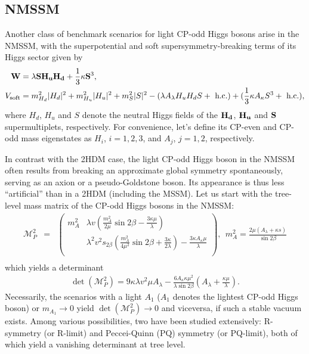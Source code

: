 \documentclass[preprintnumbers,superscriptaddress,nofootinbib,aps,prd,floatfix]{revtex4}
\begin{document}
\subsection{NMSSM}

Another class of benchmark scenarios for light CP-odd Higgs bosons arise in the NMSSM, with the superpotential and soft
supersymmetry-breaking terms of its Higgs sector given by
\begin{align}
\mathbf{W} &= \lambda \mathbf{S} \mathbf{H_u} \mathbf{H_d} + \frac{1}{3}\kappa {\bf S}^3, 
\nonumber \\
V_{\text{soft}} &= {m^2_{H_d}} |H_d|^2 + {m^2_{H_u}} |H_u|^2 + {m^2_S}|S|^2 - (\lambda A_{\lambda} H_u H_d S + \text{ h.c.} ) +  (\frac{1}{3} \kappa A_{\kappa} S^3 + \text{ h.c.} ),
\label{eqn:PQlimit}
\end{align}
where $H_d$, $H_u$ and $S$ denote the neutral Higgs fields of the ${\bf H_d}$, ${\bf H_u}$ and ${\bf S}$ supermultiplets, respectively. For convenience, let's define its CP-even and CP-odd mass eigenstates as $H_i$, $i=1,2,3$, and $A_j$, $j=1,2$, respectively.

In contrast with the 2HDM case, the light CP-odd Higgs boson in the NMSSM often results from breaking an approximate global symmetry spontaneously, serving as an axion or a pseudo-Goldstone boson. Its appearance is thus less ``artificial'' than in a 2HDM (including the MSSM). Let us start with the tree-level mass matrix of the CP-odd Higgs bosons in the NMSSM: 
\begin{eqnarray}
\mathcal{M}^2_{P} & = & \left(
\begin{array}{cc}
m_A^2
&\lambda  v \left(\frac{m_A^2 }{2\mu }\sin 2 \beta -\frac{3 \kappa  \mu }{\lambda }\right)
\\
&
\lambda ^2 v^2 s_{2\beta}  \left(\frac{m_A^2}{4\mu ^2} \sin 2 \beta+\frac{3 \kappa }{2\lambda }\right)-\frac{3
   \kappa  A_{\kappa } \mu }{\lambda }\\
\end{array} 
\right), \ \  m_A^2 = \frac{2 \mu (A_\lambda + \kappa s) }{\sin 2 \beta} \nonumber\\
\end{eqnarray}
which yields a determinant
\begin{eqnarray}
\det(\mathcal{M}^2_{P}) = 9 \kappa \lambda v^2 \mu A_\lambda - \frac{6 A_\kappa \kappa \mu^2}{\lambda \sin2\beta} \left( A_\lambda + \frac{\kappa \mu }{\lambda} \right).
\end{eqnarray}
Necessarily, the scenarios with a light $A_1$ ($A_1$ denotes the lightest CP-odd Higgs boson) or $m_{A_1} \to 0$ yield $\det(\mathcal{M}^2_{P})  \to 0$
and viceversa, if such a stable vacuum exists. Among various possibilities, two have been studied extensively: 
R-symmetry (or R-limit) and Peccei-Quinn (PQ) symmetry (or PQ-limit), both of which yield a vanishing determinant at tree level. 
\end{document}
